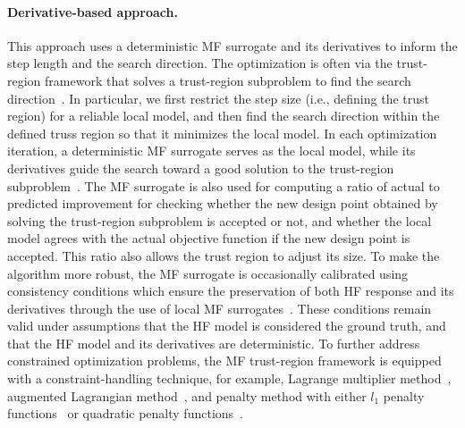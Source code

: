 \documentclass[journal ]{new-aiaa}
\begin{document}
	\paragraph{Derivative-based approach.}
	This approach uses a deterministic MF surrogate and its derivatives to inform the step length and the search direction. 
	The optimization is often via the trust-region framework that solves a trust-region subproblem to find the search direction~\citep{Nocedal2006}.
	In particular, we first restrict the step size (i.e., defining the trust region) for a reliable local model, and then find the search direction within the defined truss region so that it minimizes the local model.
	In each optimization iteration, a deterministic MF surrogate serves as the local model, while its derivatives guide the search toward a good solution to the trust-region subproblem~\citep{Alexandrov1998,Alexandrov2001,Robinson2008}.
	The MF surrogate is also used for computing a ratio of actual to predicted improvement for checking whether the new design point obtained by solving the trust-region subproblem is accepted or not, and whether the local model agrees with the actual objective function if the new design point is accepted.
	This ratio also allows the trust region to adjust its size.
	To make the algorithm more robust, the MF surrogate is occasionally
	calibrated using consistency conditions which ensure the preservation of both HF response and its derivatives through the use of local MF surrogates~\citep{Alexandrov1998,Alexandrov2001}.
	These conditions remain valid under assumptions that the HF model is considered the ground truth, and that the HF model and its derivatives are deterministic.
	To further address constrained optimization problems, the MF trust-region framework is equipped with a constraint-handling technique, for example, Lagrange multiplier method~\citep{Robinson2008,March2011}, augmented Lagrangian method~\citep{Alexandrov2001}, and penalty method with either $l_1$ penalty functions~\citep{Alexandrov2001,Gano2005} or quadratic penalty functions~\citep{Elham2015}.
	
\end{document}
